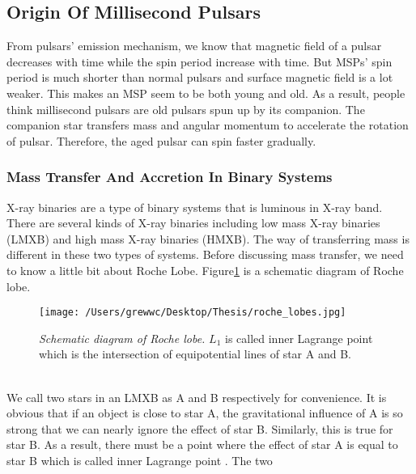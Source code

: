 \documentclass[12pt]{report}
\begin{document}
        \subsection{Origin Of Millisecond Pulsars}
            From pulsars' emission mechanism, we know that magnetic field of a pulsar decreases with time while 
            the spin period increase with time. But MSPs' spin period is much shorter than normal pulsars and 
            surface magnetic field is a lot weaker. This makes an MSP seem to be both young and old. As a result,
            people think millisecond pulsars are old pulsars spun up by its companion. The companion star transfers
            mass and angular momentum to accelerate the rotation of pulsar. 
            Therefore, the aged pulsar can spin faster gradually. 
            \subsubsection{Mass Transfer And Accretion In Binary Systems}
                X-ray binaries are a type of binary systems that is luminous in X-ray band. There are several kinds 
                of X-ray binaries including low mass X-ray binaries (LMXB) and high mass X-ray binaries (HMXB). 
                The way of transferring mass is different in these two types of systems. Before discussing mass 
                transfer, we need to know a little bit about Roche Lobe. Figure\ref{fig:roche lobe} is a 
                schematic diagram of Roche lobe.
                \begin{figure}[h]
                  \centering
                  \texttt{[image: /Users/grewwc/Desktop/Thesis/roche\_lobes.jpg]}
                  \caption{\footnotesize \textit{Schematic diagram of Roche lobe.} $L_{1}$ is called inner 
                            Lagrange point which is the intersection of equipotential lines of star A 
                            and B.}
                  \label{fig:roche lobe}
                \end{figure}\\
                \indent  We call two stars in an LMXB as A and B respectively for convenience. It is obvious 
                that if an object is close to star A, the gravitational influence of A is so strong that we can 
                nearly ignore the effect of star B. Similarly, this is true for star B. As a result, there must be 
                a point where the effect of star A is equal to star B which is called inner Lagrange point 
                \cite{0004-637X-603-1-283}. The two
\end{document}
